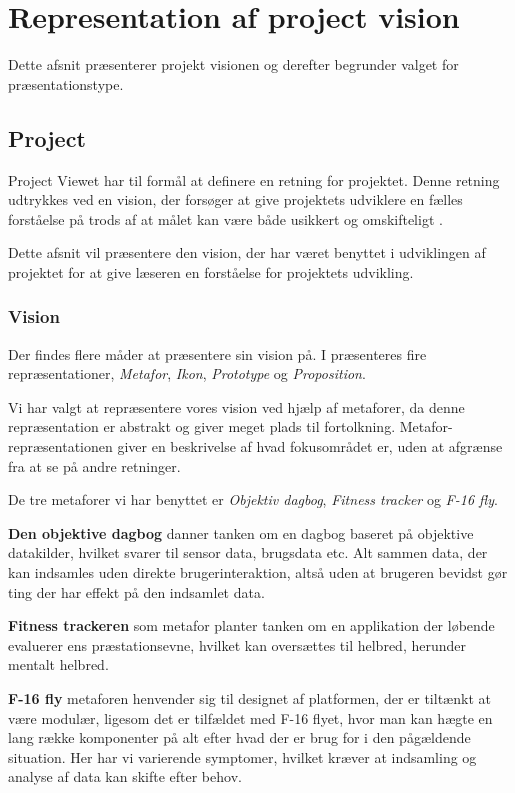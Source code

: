 \section{Representation af project vision}
Dette afsnit præsenterer projekt visionen og derefter begrunder valget for præsentationstype.
\subsection{Project}
Project Viewet har til formål at definere en retning for projektet.
Denne retning udtrykkes ved en vision, der forsøger at give projektets udviklere en fælles forståelse på trods af at målet kan være både usikkert og omskifteligt \cite[Kapitel 15 - Project]{art:essence}.

Dette afsnit vil præsentere den vision, der har været benyttet i udviklingen af projektet for at give læseren en forståelse for projektets udvikling.

\subsubsection{Vision}\label{vision}
Der findes flere måder at præsentere sin vision på. 
I \citet[Kapitel 24 - Representation]{art:essence} præsenteres fire repræsentationer, \textit{Metafor}, \textit{Ikon}, \textit{Prototype} og \textit{Proposition}.

Vi har valgt at repræsentere vores vision ved hjælp af metaforer, da denne repræsentation er abstrakt og giver meget plads til fortolkning.
Metafor-repræsentationen giver en beskrivelse af hvad fokusområdet er, uden at afgrænse fra at se på andre retninger.

De tre metaforer vi har benyttet er \textit{Objektiv dagbog}, \textit{Fitness tracker} og \textit{F-16 fly}.

\textbf{Den objektive dagbog} danner tanken om en dagbog baseret på objektive datakilder, hvilket svarer til sensor data, brugsdata etc.
Alt sammen data, der kan indsamles uden direkte brugerinteraktion, altså uden at brugeren bevidst gør ting der har effekt på den indsamlet data.

\textbf{Fitness trackeren} som metafor planter tanken om en applikation der løbende evaluerer ens præstationsevne, hvilket kan oversættes til helbred, herunder mentalt helbred.

\textbf{F-16 fly}\label{vision::fly} metaforen henvender sig til designet af platformen, der er tiltænkt at være modulær, ligesom det er tilfældet med F-16 flyet, hvor man kan hægte en lang række komponenter på alt efter hvad der er brug for i den pågældende situation.
Her har vi varierende symptomer, hvilket kræver at indsamling og analyse af data kan skifte efter behov.

